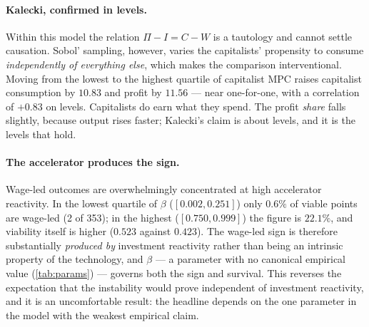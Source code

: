 \paragraph{Kalecki, confirmed in levels.} Within this model the relation
$\Pi - I = C - W$ is a tautology and cannot settle causation. Sobol' sampling,
however, varies the capitalists' propensity to consume \emph{independently of
everything else}, which makes the comparison interventional. Moving from the
lowest to the highest quartile of capitalist MPC raises capitalist consumption
by $10.83$ and profit by $11.56$ --- near one-for-one, with a correlation of
$+0.83$ on levels. Capitalists do earn what they spend. The profit
\emph{share} falls slightly, because output rises faster; Kalecki's claim is
about levels, and it is the levels that hold.

\paragraph{The accelerator produces the sign.} Wage-led outcomes are
overwhelmingly concentrated at high accelerator reactivity. In the lowest
quartile of $\beta$ ($[0.002, 0.251]$) only $0.6\%$ of viable points are
wage-led (2 of 353); in the highest ($[0.750, 0.999]$) the figure is $22.1\%$,
and viability itself is higher ($0.523$ against $0.423$). The wage-led sign is
therefore substantially \emph{produced by} investment reactivity rather than
being an intrinsic property of the technology, and $\beta$ --- a parameter
with no canonical empirical value (\cref{tab:params}) --- governs both the
sign and survival. This reverses the expectation that the instability would
prove independent of investment reactivity, and it is an uncomfortable result:
the headline depends on the one parameter in the model with the weakest
empirical claim.
